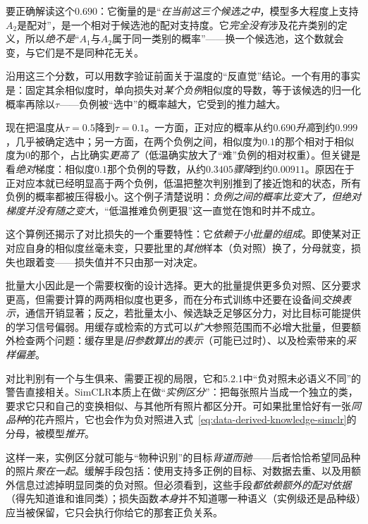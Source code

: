 要正确解读这个$0.690$：它衡量的是“\emph{在当前这三个候选之中}，模型多大程度上支持$A_2$是配对”，是一个相对于候选池的配对支持度。它\emph{完全没有}涉及花卉类别的定义，所以\emph{绝不是}“$A_1$与$A_2$属于同一类别的概率”——换一个候选池，这个数就会变，与它们是不是同种花无关。

沿用这三个分数，可以用数字验证前面关于温度的“反直觉”结论。一个有用的事实是：固定其余相似度时，单向损失对\emph{某个负例}相似度的导数，等于该候选的归一化概率再除以$\tau$——负例被“选中”的概率越大，它受到的推力越大。

现在把温度从$\tau=0.5$降到$\tau=0.1$。一方面，正对应的概率从约$0.690$\emph{升高}到约$0.999$，几乎被确定选中；另一方面，在两个负例之间，相似度为$0.1$的那个相对于相似度为$0$的那个，占比确实\emph{更高了}（低温确实放大了“难”负例的相对权重）。但关键是看\emph{绝对}梯度：相似度$0.1$那个负例的导数，从约$0.3405$\emph{骤降}到约$0.00911$。原因在于正对应本就已经明显高于两个负例，低温把整次判别推到了接近饱和的状态，所有负例的概率都被压得极小。这个例子清楚说明：\emph{负例之间的概率比变大了，但绝对梯度并没有随之变大}，“低温推难负例更狠”这一直觉在饱和时并不成立。

这个算例还揭示了对比损失的一个重要特性：它\emph{依赖于小批量的组成}。即使某对正对应自身的相似度丝毫未变，只要批里的\emph{其他}样本（负对照）换了，分母就变，损失也跟着变——损失值并不只由那一对决定。

批量大小因此是一个需要权衡的设计选择。更大的批量提供更多负对照、区分要求更高，但需要计算的两两相似度也更多，而在分布式训练中还要在设备间\emph{交换表示}，通信开销显著；反之，若批量太小、候选缺乏足够区分力，对比目标可能提供的学习信号偏弱。用缓存或检索的方式可以\emph{扩大}参照范围而不必增大批量，但要额外检查两个问题：缓存里是\emph{旧参数算出的表示}（可能已过时）、以及检索带来的\emph{采样偏差}。

对比判别有一个与生俱来、需要正视的局限，它和5.2.1中“负对照未必语义不同”的警告直接相关。SimCLR本质上在做“\emph{实例区分}”：把每张照片当成一个独立的类，要求它只和自己的变换相似、与其他所有照片都区分开。可如果批里恰好有一张\emph{同品种}的花卉照片，它也会作为负对照进入式~\eqref{eq:data-derived-knowledge-simclr}的分母，被模型\emph{推开}。

这样一来，实例区分就可能与“物种识别”的目标\emph{背道而驰}——后者恰恰希望同品种的照片\emph{聚在一起}。缓解手段包括：使用支持多正例的目标、对数据去重、以及用额外信息过滤掉明显同类的负对照。但必须看到，这些手段\emph{都依赖额外的配对依据}（得先知道谁和谁同类）；损失函数\emph{本身}并不知道哪一种语义（实例级还是品种级）应当被保留，它只会执行你给它的那套正负关系。

